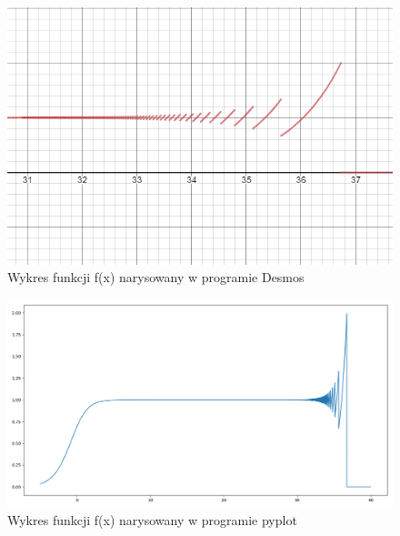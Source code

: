 \documentclass[]{article}
\begin{document}
	
	\begin{figure}[!htbp]
		\includegraphics[scale=0.9]{task2_plot_desmos_broken}
		\centering
		\caption{Wykres funkcji f(x) narysowany w programie Desmos}
	\end{figure}
	\clearpage
	\begin{figure}[!htbp]
		\includegraphics[scale=0.7]{task2_plot_pyplot}
		\centering
		\caption{Wykres funkcji f(x) narysowany w programie pyplot}
	\end{figure}
\end{document}
